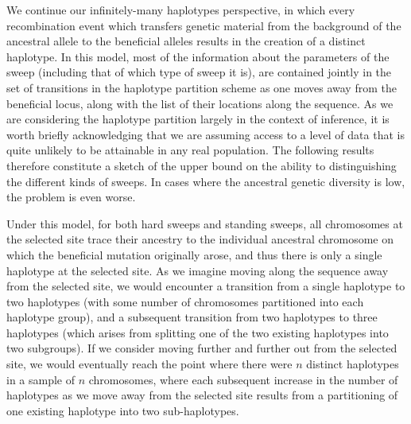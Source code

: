 \documentclass[a4paper,10pt]{article}
\begin{document}

We continue our infinitely-many haplotypes perspective, in which every recombination event which transfers genetic material from the background of the ancestral allele to the beneficial alleles results in the creation of a distinct haplotype. In this model, most of the information about the parameters of the sweep (including that of which type of sweep it is), are contained jointly in the set of transitions in the haplotype partition scheme as one moves away from the beneficial locus, along with the list of their locations along the sequence. As we are considering the haplotype partition largely in the context of inference, it is worth briefly acknowledging that we are assuming access to a level of data that is quite unlikely to be attainable in any real population. The following results therefore constitute a sketch of the upper bound on the ability to distinguishing the different kinds of sweeps. In cases where the ancestral genetic diversity is low, the problem is even worse.

Under this model, for both hard sweeps and standing sweeps, all chromosomes at the selected site trace their ancestry to the individual ancestral chromosome on which the beneficial mutation originally arose, and thus there is only a single haplotype at the selected site. As we imagine moving along the sequence away from the selected site, we would encounter a transition from a single haplotype to two haplotypes (with some number of chromosomes partitioned into each haplotype group), and a subsequent transition from two haplotypes to three haplotypes (which arises from splitting one of the two existing haplotypes into two subgroups). If we consider moving further and further out from the selected site, we would eventually reach the point where there were $n$ distinct haplotypes in a sample of $n$ chromosomes, where each subsequent increase in the number of haplotypes as we move away from the selected site results from a partitioning of one existing haplotype into two sub-haplotypes.
\end{document}
